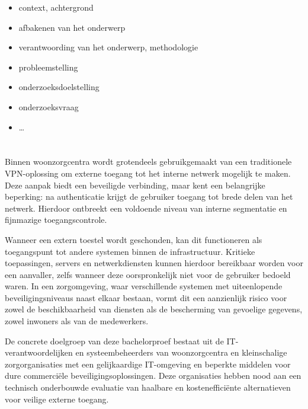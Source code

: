 \begin{itemize}
  \item context, achtergrond
  \item afbakenen van het onderwerp
  \item verantwoording van het onderwerp, methodologie
  \item probleemstelling
  \item onderzoeksdoelstelling
  \item onderzoeksvraag
  \item \ldots
\end{itemize}

\section{}%
\label{sec:probleemstelling}


Binnen woonzorgcentra wordt grotendeels gebruikgemaakt van een traditionele VPN-oplossing om externe toegang tot het interne netwerk mogelijk te maken. Deze aanpak biedt een beveiligde verbinding, maar kent een belangrijke beperking: na authenticatie krijgt de gebruiker toegang tot brede delen van het netwerk. Hierdoor ontbreekt een voldoende niveau van interne segmentatie en fijnmazige toegangscontrole.

Wanneer een extern toestel wordt geschonden, kan dit functioneren als toegangspunt tot andere systemen binnen de infrastructuur. Kritieke toepassingen, servers en netwerkdiensten kunnen hierdoor bereikbaar worden voor een aanvaller, zelfs wanneer deze oorspronkelijk niet voor de gebruiker bedoeld waren. In een zorgomgeving, waar verschillende systemen met uiteenlopende beveiligingsniveaus naast elkaar bestaan, vormt dit een aanzienlijk risico voor zowel de beschikbaarheid van diensten als de bescherming van gevoelige gegevens, zowel inwoners als van de medewerkers.

De concrete doelgroep van deze bachelorproef bestaat uit de IT-verantwoordelijken en systeembeheerders van woonzorgcentra en kleinschalige zorgorganisaties met een gelijkaardige IT-omgeving en beperkte middelen voor dure commerciële beveiligingsoplossingen. Deze organisaties hebben nood aan een technisch onderbouwde evaluatie van haalbare en kostenefficiënte alternatieven voor veilige externe toegang.


\section{}%
\label{sec:onderzoeksvraag}

